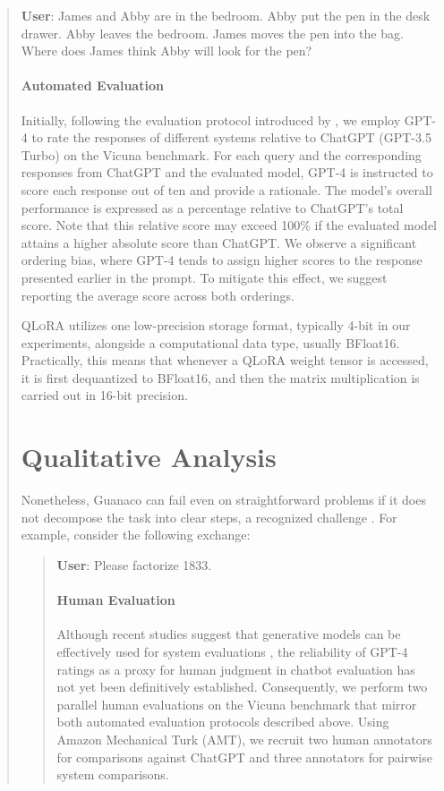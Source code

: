 \begin{quote}
    \textbf{User}: James and Abby are in the bedroom. Abby put the pen in the desk drawer. Abby leaves the bedroom. James moves the pen into the bag. Where does James think Abby will look for the pen?

\paragraph{Automated Evaluation} Initially, following the evaluation protocol introduced by \citet{vicuna2023}, we employ GPT-4 to rate the responses of different systems relative to ChatGPT (GPT-3.5 Turbo) on the Vicuna benchmark. For each query and the corresponding responses from ChatGPT and the evaluated model, GPT-4 is instructed to score each response out of ten and provide a rationale. The model’s overall performance is expressed as a percentage relative to ChatGPT’s total score. Note that this relative score may exceed 100\% if the evaluated model attains a higher absolute score than ChatGPT. We observe a significant ordering bias, where GPT-4 tends to assign higher scores to the response presented earlier in the prompt. To mitigate this effect, we suggest reporting the average score across both orderings.

\textsc{QLoRA} utilizes one low-precision storage format, typically 4-bit in our experiments, alongside a computational data type, usually BFloat16. Practically, this means that whenever a \textsc{QLoRA} weight tensor is accessed, it is first dequantized to BFloat16, and then the matrix multiplication is carried out in 16-bit precision.



\section{Qualitative Analysis}

Nonetheless, {Guanaco} can fail even on straightforward problems if it does not decompose the task into clear steps, a recognized challenge \cite{weichain}. For example, consider the following exchange:

\begin{quote}
    \textbf{User}: Please factorize 1833.

\paragraph{Human Evaluation} Although recent studies suggest that generative models can be effectively used for system evaluations \citep{fu2023gptscore}, the reliability of GPT-4 ratings as a proxy for human judgment in chatbot evaluation has not yet been definitively established. Consequently, we perform two parallel human evaluations on the Vicuna benchmark that mirror both automated evaluation protocols described above. Using Amazon Mechanical Turk (AMT), we recruit two human annotators for comparisons against ChatGPT and three annotators for pairwise system comparisons.


\end{quote}
\end{quote}
